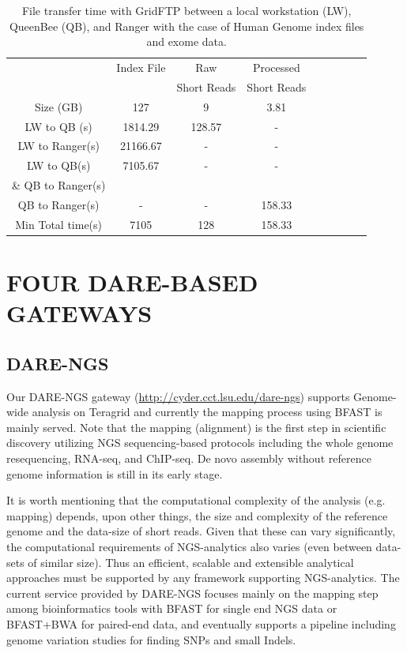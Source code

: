 \documentclass{sig-alternate}
\begin{document}
 \begin{table}
 \small
 \begin{tabular}{|c|c|c|c|c|c|c|c|c|} 
 \hline 
	                      &  Index File	&Raw &	Processed\\
	                      &&Short Reads& Short Reads\\
\hline 
Size  (GB)    	             &127&	9	&3.81\\
 \hline                       
LW to QB (s)   & 1814.29&	128.57&  -\\
  \hline
LW to Ranger(s) & 21166.67 & - & -\\
   \hline
LW to QB(s)    & 7105.67& - &-\\
 \& QB to Ranger(s)     &&&\\
 \hline
QB to Ranger(s)   	&-&-& 158.33\\
\hline
Min Total time(s)    &	7105 &	128&	158.33\\
 \hline
\end{tabular}
\caption{File transfer time with GridFTP between a local workstation (LW), QueenBee (QB), and Ranger with the case of Human Genome index files and exome data.  }

 \label{table:NGS-Distributed-file} 
\end{table}


\section{FOUR DARE-BASED GATEWAYS}
\subsection{DARE-NGS}
Our DARE-NGS gateway (\url {http://cyder.cct.lsu.edu/dare-ngs}) supports Genome-wide analysis on Teragrid and currently the mapping process using BFAST is mainly served\cite{bfast2009, bfast2009b}. Note that the mapping (alignment) is the first step in scientific discovery utilizing NGS sequencing-based protocols including the whole genome resequencing, RNA-seq, and ChIP-seq.  De novo assembly without reference genome information is still in its early stage.  

It is worth mentioning that the computational complexity
of the analysis (e.g. mapping) depends, upon other things, the size
and complexity of the reference genome and the data-size of short reads.
Given that these can vary significantly, the computational
requirements of NGS-analytics also varies (even between data-sets of
similar size).  Thus an efficient, scalable and extensible analytical
approaches must be supported by any framework supporting
NGS-analytics.  The current service provided by DARE-NGS focuses mainly on the mapping step among bioinformatics tools with BFAST for single end NGS data or BFAST+BWA for paired-end data, and eventually supports a pipeline including genome variation studies for finding SNPs and small Indels.
\end{document}
